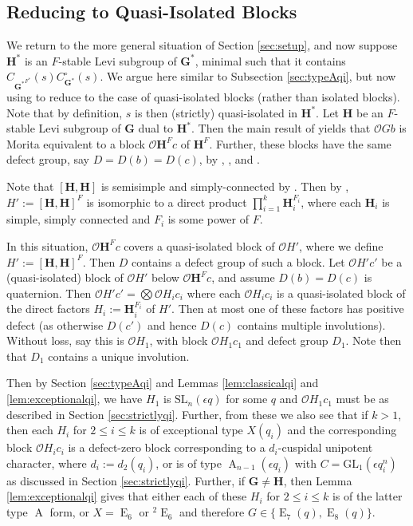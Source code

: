 \documentclass{amsart}
\theoremstyle{plain}\newtheorem{Theorem}{Theorem}[section]
\theoremstyle{plain}\newtheorem{Conjecture}[Theorem]{Conjecture}
\theoremstyle{plain}\newtheorem{Corollary}[Theorem]{Corollary}
\theoremstyle{plain}\newtheorem{Lemma}[Theorem]{Lemma}
\theoremstyle{plain}\newtheorem{Proposition}[Theorem]{Proposition}
\theoremstyle{definition}\newtheorem{Definition}[Theorem]{Definition}
\theoremstyle{definition}\newtheorem{Example}[Theorem]{Example}
\theoremstyle{definition}\newtheorem{Examples}[Theorem]{Examples}
\theoremstyle{definition}\newtheorem{Exercise}[Theorem]{Exercise}
\theoremstyle{definition}\newtheorem{Notation}[Theorem]{Notation}
\theoremstyle{definition}\newtheorem{Remark}[Theorem]{Remark}
\theoremstyle{definition}\newtheorem{Remarks}[Theorem]{Remarks}
\def\CO{{\mathcal{O}}}    \def\OPE{{\mathcal{O}(P\rtimes E)}}
\def\GL{\mathrm{GL}}
\def\SL{\mathrm{SL}}
\newcommand{\bG}{{\mathbf{G}}}
\newcommand{\bH}{{\mathbf{H}}}
\newcommand{\type}{\operatorname}
\newcommand{\tw}[1]{{}^#1\!}
\newcommand{\tA}{\type{A}}
\newcommand{\tE}{\type{E}}
\newcommand{\cent} {C}
\numberwithin{equation}{section}
\begin{document}
\subsection{Reducing to Quasi-Isolated Blocks}\label{sec:reducetoqi}
We return to the more general situation of Section \ref{sec:setup}, and now suppose $\bH^\ast$ is an $F$-stable Levi subgroup of $\bG^\ast$, minimal such that it contains $\cent_{{\bG^\ast}^{F^\ast}}(s)\cent_{\bG^\ast}^\circ(s)$. We argue here similar to Subsection \ref{sec:typeAqi}, but now using \cite{BR} to reduce to the case of quasi-isolated blocks (rather than isolated blocks).  Note that by definition, $s$ is then (strictly) quasi-isolated in $\bH^\ast$. Let $\bH$ be an $F$-stable Levi subgroup of $\bG$ dual to $\bH^\ast$. Then the main result of \cite{BR} yields that $\CO G b$ is Morita equivalent to a block $\CO \bH^F c$ of $\bH^F$. Further, these blocks have the same defect group, say $D=D(b)=D(c)$, by \cite[Thm.~7.7]{BDR}, \cite[Thm.~2]{Ruh20}, and \cite[Thm.~7.14]{KM13}. 

Note that $[\bH, \bH]$ is semisimple and simply-connected by \cite[Props.~6.20(c),~12.14]{MT}. Then by \cite[Cor.~1.5.16]{GM20}, $H':=[\bH, \bH]^F$ is isomorphic to a direct product $\prod_{i=1}^k \bH_i^{F_i}$, where each $\bH_i$ is simple, simply connected and $F_i$ is some power of $F$. 

In this situation, $\CO \bH^F c$ covers a quasi-isolated block of $\CO H'$, where we define $H':=[\bH, \bH]^F$. Then $D$ contains a defect group of such a block. Let $\CO H'c'$ be a (quasi-isolated) block of $\CO H'$ below $\CO \bH^F c$, and assume $D(b)=D(c)$ is quaternion. Then $\CO H' c'=\bigotimes \CO H_ic_i$ where each $\CO H_ic_i$ is a quasi-isolated block of the direct factors $H_i:=\bH_i^{F_i}$ of $H'$. Then at most one of these factors has positive defect (as otherwise $D(c')$ and hence $D(c)$  contains multiple involutions). Without loss, say this is $\CO H_1$, with block $\CO H_1c_1$ and defect group $D_1$. Note then that $D_1$ contains a unique involution.

Then by Section \ref{sec:typeAqi} and Lemmas  \ref{lem:classicalqi} and \ref{lem:exceptionalqi}, we have $H_1$ is $\SL_n(\epsilon q)$ for some $q$ and $\CO H_1c_1$ must be as described in Section \ref{sec:strictlyqi}. Further, from these we also see that if $k>1$, then each $H_i$ for $2\leq i\leq k$ is of exceptional type $X(q_i)$ and the corresponding block $\CO H_ic_i$ is a defect-zero block corresponding to a $d_i$-cuspidal unipotent character, where $d_i:=d_2(q_i)$, or is of type $\type{A}_{n-1}(\epsilon q_i)$ with $C=\GL_1(\epsilon q_i^n)$ as discussed in Section \ref{sec:strictlyqi}. Further, if $\bG\neq \bH$, then Lemma \ref{lem:exceptionalqi} gives that either each of these $H_i$ for $2\leq i\leq k$ is of the latter type $\tA$ form, or $X=\tE_6$ or $\tw{2}\tE_6$ and therefore $G\in\{\tE_7(q), \tE_8(q)\}$.
\end{document}
